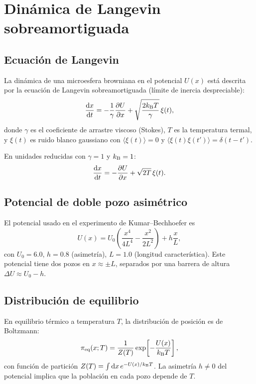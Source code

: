 \section{Dinámica de Langevin sobreamortiguada}

\subsection{Ecuación de Langevin}

La dinámica de una microesfera browniana en el potencial $U(x)$ está descrita 
por la ecuación de Langevin sobreamortiguada (límite de inercia despreciable):
\begin{equation}
    \dv{x}{t} = -\frac{1}{\gamma} \pdv{U}{x} + \sqrt{\frac{2 k_{\mathrm{B}} T}{\gamma}} \, \xi(t),
    \label{eq:langevin}
\end{equation}
%
donde $\gamma$ es el coeficiente de arrastre viscoso (Stokes), 
$T$ es la temperatura termal, y $\xi(t)$ es ruido blanco gaussiano con 
$\langle \xi(t) \rangle = 0$ y $\langle \xi(t) \xi(t') \rangle = \delta(t-t')$.

En unidades reducidas con $\gamma = 1$ y $k_{\mathrm{B}} = 1$:
\begin{equation}
    \dv{x}{t} = -\pdv{U}{x} + \sqrt{2 T} \, \xi(t).
\end{equation}

\subsection{Potencial de doble pozo asimétrico}

El potencial usado en el experimento de Kumar--Bechhoefer es
\begin{equation}
    U(x) = U_{0} \left(\frac{x^{4}}{4 L^{4}} - \frac{x^{2}}{2 L^{2}}\right) + h \frac{x}{L},
    \label{eq:double_well}
\end{equation}
%
con $U_{0} = 6.0$, $h = 0.8$ (asimetría), $L = 1.0$ (longitud característica). 
Este potencial tiene dos pozos en $x \approx \pm L$, separados por una barrera 
de altura $\Delta U \approx U_{0} - h$.

\subsection{Distribución de equilibrio}

En equilibrio térmico a temperatura $T$, la distribución de posición es de 
Boltzmann:
\begin{equation}
    \pi_{\mathrm{eq}}(x; T) = \frac{1}{Z(T)} \exp\!\left[-\frac{U(x)}{k_{\mathrm{B}} T}\right],
\end{equation}
%
con función de partición $Z(T) = \int \dd{x} e^{-U(x)/k_{\mathrm{B}} T}$. La asimetría 
$h \neq 0$ del potencial implica que la población en cada pozo depende de $T$.

